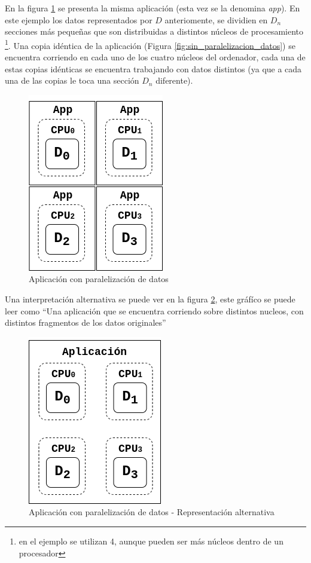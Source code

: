 En la figura \ref{fig:con_paralelizacion_datos} se presenta la misma
aplicación (esta vez se la denomina \textit{app}). En este ejemplo
los datos representados por $D$ anteriomente, se
dividien en $D_{n}$ secciones más pequeñas que son distribuidas a distintos
núcleos de procesamiento \footnote{en el ejemplo se utilizan 4, aunque pueden ser más
núcleos dentro de un procesador}. Una copia idéntica de la aplicación (Figura
\ref{fig:sin_paralelizacion_datos}) se encuentra corriendo en cada uno de los
cuatro núcleos del ordenador, cada una de estas copias idénticas se
encuentra trabajando con datos distintos (ya que a cada una de las copias le
toca una sección $D_{n}$ diferente).

\begin{figure}[h]
  \centering
  \includegraphics[width=0.3\linewidth]{figuras/procesamiento_paralelo_con_paralelizacion_datos.png}
  \caption{Aplicación con paralelización de datos}
  \label{fig:con_paralelizacion_datos}
\end{figure}

Una interpretación alternativa se puede ver en la figura
\ref{fig:con_paralelizacion_datos_alt}, este gráfíco se puede leer como ``Una
aplicación que se encuentra corriendo sobre distintos nucleos, con distintos
fragmentos de los datos originales''

\begin{figure}[h]
  \centering
  \includegraphics[width=0.3\linewidth]{figuras/procesamiento_paralelo_con_paralelizacion_datos_alt.png}
  \caption{Aplicación con paralelización de datos - Representación alternativa}
  \label{fig:con_paralelizacion_datos_alt}
\end{figure}
